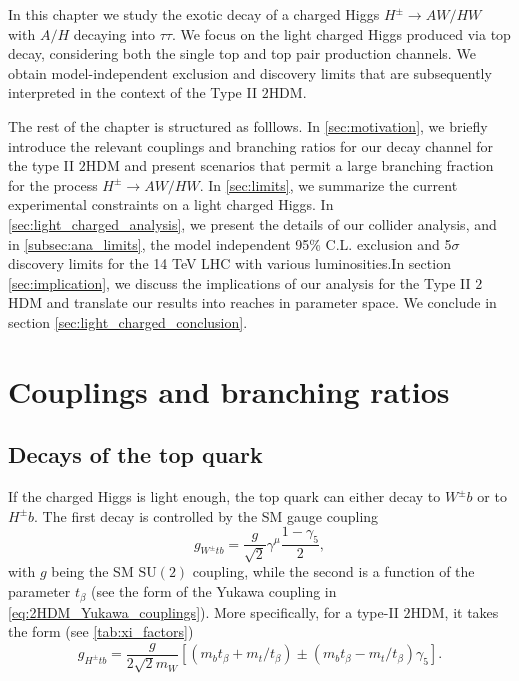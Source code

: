In this chapter we study the exotic decay of a charged Higgs $H^\pm\to AW/HW$  with $A/H$ decaying into  $\tau\tau$.  We focus on the light charged Higgs produced via top decay, considering both the single top and top pair production channels. We obtain model-independent exclusion and discovery limits that are subsequently interpreted in the context of the Type II $2$HDM.

The rest of the chapter is structured as folllows. In \autoref{sec:motivation}, we briefly introduce the relevant couplings and branching ratios for our decay channel for the type II $2$HDM and present scenarios that permit a large branching fraction for the process $H^{\pm} \rightarrow AW/HW$. In \autoref{sec:limits}, we summarize the current experimental constraints on a light charged Higgs. In \autoref{sec:light_charged_analysis}, we present the details of our collider analysis, and in \autoref{subsec:ana_limits}, the model independent 95\% C.L. exclusion and 5$\sigma$ discovery limits for the 14 TeV LHC with various luminosities.In section \ref{sec:implication}, we discuss the implications of our analysis for the Type II $2$HDM and translate our results into reaches in parameter space. We conclude in section \ref{sec:light_charged_conclusion}.
 
\section{Couplings and branching ratios} \label{sec:motivation}

\subsection{Decays of the top quark}
If the charged Higgs is light enough, the top quark can either decay to $W^\pm b$ or to $H^{\pm}b$. The first decay is controlled by the SM gauge coupling
\begin{equation}
g_{W^{\pm} tb} = \frac{g}{\sqrt{2}} \gamma^\mu \frac{1-\gamma_5}{2}, 
\end{equation}
with $g$ being the SM $\text{SU}(2)$ coupling, while the second is a function of the parameter $t_{\beta}$ (see the form of the Yukawa coupling in \eqref{eq:2HDM_Yukawa_couplings}). More specifically, for a type-II $2$HDM, it takes the form (see \autoref{tab:xi_factors}) 
\begin{equation}
g_{H^{\pm} tb} = \frac{g}{2 \sqrt{2} m_W} \left[ (m_b t_{\beta} + m_t /t_\beta) \pm (m_b t_{\beta} - m_t /t_\beta ) \gamma_5 \right].
\end{equation}

